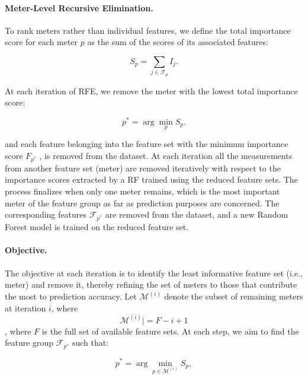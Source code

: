 \documentclass[journal]{IEEEtran}  %
\begin{document}
\paragraph{Meter-Level Recursive Elimination.}
To rank meters rather than individual features, we define the total importance score for each meter $p$ as the sum of the scores of its associated features:

\begin{equation}
\label{eq:Ensamble Prediction}
S_p = \sum_{j \in \mathcal{F}_p} I_j.
\end{equation}

At each iteration of RFE, we remove the meter with the lowest total importance score:

\begin{equation}
\label{eq:Minimum Feature score}
p^\ast = \arg\min_{p} S_p.
\end{equation}

and each feature belonging into the feature set with the minimum importance score $F_{p^*}$ , is removed from the dataset. At each iteration all the measurements from another feature set (meter) are removed iteratively with respect to the importance scores extracted by a RF trained using the reduced feature sets. The process finalizes when only one meter remains, which is the most important meter of the feature group as far as prediction purposes are concerned. The corresponding features $\mathcal{F}_{p^\ast}$ are removed from the dataset, and a new Random Forest model is trained on the reduced feature set.

\paragraph{Objective.}

The objective at each iteration is to identify the least informative feature set (i.e., meter) and remove it, thereby refining the set of meters to those that contribute the most to prediction accuracy. Let \(\mathcal{M}^{(i)}\) denote the subset of remaining meters at iteration \(i\), where
\begin{equation}
\label{Feature set in step i}
\mathcal{M}^{(i)}| = F - i + 1
\end{equation}, where $F$ is the full set of available feature sets. At each step, we aim to find the feature group \(\mathcal{F}_{p^*}\) such that:

\begin{equation}
\label{Feature set in step i}
p^* = \arg\min_{p \in \mathcal{M}^{(i)}} S_p,
\end{equation}
\end{document}
